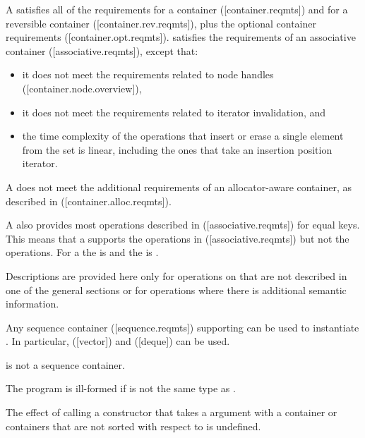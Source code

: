 \begin{addedblock}
\pnum
A  satisfies all of the requirements for a container
([container.reqmts]) and for a reversible container ([container.rev.reqmts]),
plus the optional container requirements ([container.opt.reqmts]).  
satisfies the requirements of an associative container ([associative.reqmts]), except that:
\begin{itemize}
\item it does not meet the requirements related to node handles ([container.node.overview]),
\item it does not meet the requirements related to iterator invalidation, and
\item the time complexity of the operations that insert or erase a single
element from the set is linear, including the ones that take an insertion
position iterator.
\end{itemize}
\begin{note}A  does not meet the additional requirements of an
allocator-aware container, as described in ([container.alloc.reqmts]).\end{note}

\pnum
A  also provides most operations described
in ([associative.reqmts]) for equal keys.  This means that a
 supports the  operations
in ([associative.reqmts]) but not the  operations.  For
a  the  is  and the
 is .

\pnum
Descriptions are provided here only for operations on 
that are not described in one of the general sections or for operations where
there is additional semantic information.

\pnum
Any sequence container ([sequence.reqmts]) supporting 
can be used to instantiate . In
particular,  ([vector]) and  ([deque]) can be
used.  \begin{note} is not a sequence container.\end{note}

\pnum
The program is ill-formed if  is not the same type
as .

\pnum
The effect of calling a constructor that takes a 
argument with a container or containers that are not sorted with respect
to  is undefined.


\end{addedblock}
